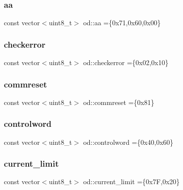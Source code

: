 \subsubsection{\texorpdfstring{aa}{aa}}
{\footnotesize\ttfamily const vector$<$uint8\+\_\+t$>$ od\+::aa =\{0x71,0x60,0x00\}}

\mbox{\label{namespaceod_ac4b980a10ae256ea019a767459b6ba9b}} 
\subsubsection{\texorpdfstring{checkerror}{checkerror}}
{\footnotesize\ttfamily const vector$<$uint8\+\_\+t$>$ od\+::checkerror =\{0x02,0x10\}}

\mbox{\label{namespaceod_a75b2ed7fb6e21d4335334e1525fd223c}} 
\subsubsection{\texorpdfstring{commreset}{commreset}}
{\footnotesize\ttfamily const vector$<$uint8\+\_\+t$>$ od\+::commreset =\{0x81\}}

\mbox{\label{namespaceod_acb23d3cf4cdb0ce0c85a884a5a97ac00}} 
\subsubsection{\texorpdfstring{controlword}{controlword}}
{\footnotesize\ttfamily const vector$<$uint8\+\_\+t$>$ od\+::controlword =\{0x40,0x60\}}

\mbox{\label{namespaceod_a8c8991f592c7384071f4d1773ba1609b}} 
\subsubsection{\texorpdfstring{current\+\_\+limit}{current\_limit}}
{\footnotesize\ttfamily const vector$<$uint8\+\_\+t$>$ od\+::current\+\_\+limit =\{0x7\+F,0x20\}}

\mbox{\label{namespaceod_ae572be966c7d5de90544f2ac32dbbd38}} 
